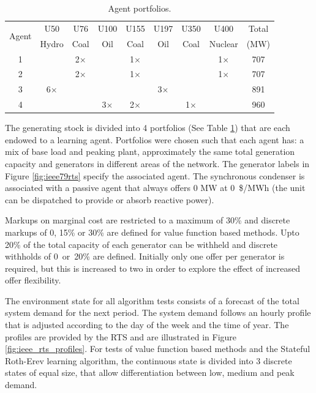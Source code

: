 \begin{table}
\centering
\begin{tabular}{c|c|c|c|c|c|c|c|c}
\hline
\multirow{2}{*}{Agent} &U50 &U76 &U100 &U155 &U197 &U350 &U400 &Total \\
 &Hydro &Coal &Oil &Coal &Oil &Coal &Nuclear &(MW) \\
\hline\hline
1 & &2$\times$ & &1$\times$ & & &1$\times$ &707 \\
2 & &2$\times$ & &1$\times$ & & &1$\times$ &707 \\
3 &6$\times$ & & & &3$\times$ & & &891 \\
4 & & &3$\times$ &2$\times$ & &1$\times$ & &960 \\
\hline
\end{tabular}
\caption{Agent portfolios.}
\label{tbl:agent_portfolios}
\end{table}

The generating stock is divided into 4 portfolios (See Table
\ref{tbl:agent_portfolios}) that are each endowed to a learning agent.
Portfolios were chosen such that each agent has: a mix of base load and peaking
plant, approximately the same total generation capacity and generators in
different areas of the network.  The generator labels in Figure
\ref{fig:ieee79rts} specify the associated agent.  The synchronous condenser is
associated with a passive agent that always offers 0 MW at 0~\$/MWh (the
unit can be dispatched to provide or absorb reactive power).


Markups on marginal cost are restricted to a maximum of 30\% and discrete
markups of 0, 15\% or 30\% are defined for value function based methods.  Upto 20\% of
the total capacity of each generator can be withheld and discrete withholds of
0~or~20\% are defined.  Initially only one offer per generator is required, but
this is increased to two in order to explore the effect of increased offer
flexibility.

The environment state for all algorithm tests consists of a forecast of the
total system demand for the next period.  The system demand follows an hourly
profile that is adjusted according to the day of the week and the time of year.
The profiles are provided by the RTS and are illustrated in Figure
\ref{fig:ieee_rts_profiles}.  For tests of value function based methods and the
Stateful Roth-Erev learning algorithm, the continuous state is divided into 3
discrete states of equal size, that allow differentiation between low, medium
and peak demand.

